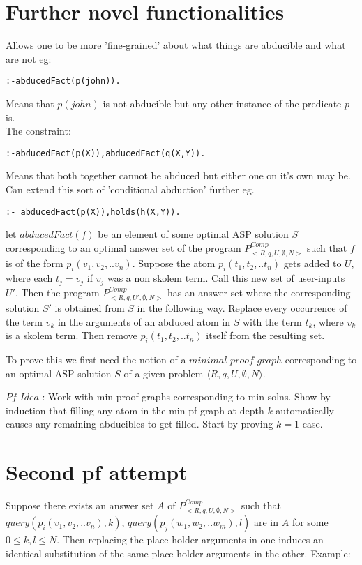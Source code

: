 \documentclass[sigconf]{acmart}
\begin{document}
\section{Further novel functionalities}
Allows one to be more 'fine-grained' about what things are abducible and what are not eg:
\begin{verbatim}
:-abducedFact(p(john)).    
\end{verbatim}
Means that $p(john)$ is not abducible but any other instance of the predicate $p$ is.\\
\newline
The constraint:
\begin{verbatim}
:-abducedFact(p(X)),abducedFact(q(X,Y)).
\end{verbatim}
Means that both together cannot be abduced but either one on it's own may be. Can extend this sort of 'conditional abduction' further eg.
\begin{verbatim}
:- abducedFact(p(X)),holds(h(X,Y)).  
\end{verbatim}


let $abducedFact(f)$ be an element of some optimal ASP solution $S$ corresponding to an optimal answer set of the program $P_{<R,q,U,\emptyset,N>}^{Comp}$ such that $f$ is of the form $p_{i}(v_{1},v_{2},..v_{n})$. Suppose the atom $p_{i}(t_{1},t_{2},..t_{n})$ gets added to $U$, where each $t_{j} = v_{j}$ if $v_{j}$ was a non skolem term. Call this new set of user-inputs $U'$. Then the program $P_{<R,q,U',\emptyset,N>}^{Comp}$ has an answer set where the corresponding solution $S'$ is obtained from $S$ in the following way. Replace every occurrence of the term $v_{k}$ in the arguments of an abduced atom in $S$ with the term $t_{k}$, where $v_{k}$ is a skolem term. Then remove $p_{i}(t_{1},t_{2},..t_{n})$ itself from the resulting set.

To prove this we first need the notion of a $minimal$ $proof$ $graph$ corresponding to an optimal ASP solution $S$ of a given problem $\langle R,q,U,\emptyset,N\rangle$.

$\textit{Pf Idea}$ : Work with min proof graphs corresponding to min solns. Show by induction that filling any atom in the min pf graph at depth $k$ automatically causes any remaining abducibles to get filled. Start by proving $k=1$ case.

\section{Second pf attempt}
Suppose there exists an answer set $A$ of $P_{<R,q,U,\emptyset,N>}^{Comp}$ such that $query(p_{i}(v_{1},v_{2},..v_{n}),k)$, $query(p_{j}(w_{1},w_{2},..w_{m}),l)$ are in $A$ for some $0\leq k, l \leq N$. Then replacing the place-holder arguments in one induces an identical substitution of the same place-holder arguments in the other. Example:
\end{document}
